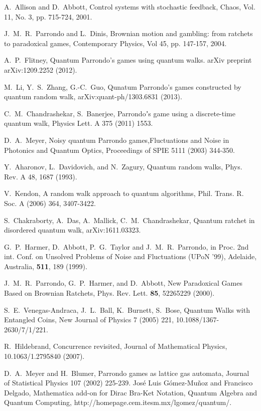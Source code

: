 \documentclass[english,aps,pra,amsmath,amssymb,showpacs,notitlepage,onecolumn]{revtex4-1}
\begin{document}
\begin{thebibliography}{99}
A.~Allison and D.~Abbott, Control systems with stochastic feedback, Chaos, Vol. 11, No. 3, pp. 715-724, 2001.

J.~M.~R.~Parrondo and L.~Dinis, Brownian motion and gambling: from ratchets to paradoxical games, Contemporary Physics, Vol 45, pp. 147-157, 2004.

A.~P.~Flitney, Quantum Parrondo's games using quantum walks. arXiv preprint arXiv:1209.2252 (2012).

M.~Li, Y.~S.~Zhang, G.-C.~Guo, Qunatum Parrondo's games constructed by quantum random walk, arXiv:quant-ph/1303.6831 (2013).

C.~M.~Chandrashekar, S.~Banerjee, Parrondoʼs game using a discrete-time quantum walk, Physics Lett. A 375 (2011) 1553.

D.~A.~Meyer, Noisy quantum Parrondo games,Fluctuations and Noise in Photonics and Quantum Optics, Proceedings of SPIE 5111 (2003) 344-350.

Y.~Aharonov, L.~Davidovich, and N.~Zagury, Quantum random walks, Phys. Rev. A 48, 1687 (1993).

V.~Kendon, A random walk approach to quantum algorithms, Phil. Trans. R. Soc. A (2006) 364, 3407-3422. 

S.~Chakraborty, A.~Das, A.~Mallick, C.~M.~Chandrashekar, Quantum ratchet in disordered quantum walk, arXiv:1611.03323.

 G.~P.~Harmer, D.~Abbott, P.~G.~Taylor and J.~M.~R.~Parrondo, in Proc. 2nd int. Conf. on Unsolved Problems of Noise and Fluctuations (UPoN '99), Adelaide, Australia, \textbf{511}, 189 (1999). %

 J.~M.~R.~Parrondo, G.~P.~Harmer, and D.~Abbott, New Paradoxical Games Based on Brownian Ratchets, Phys. Rev. Lett. \textbf{85}, 5226\textendash{}5229 (2000). %

S.~E.~Venegas-Andraca, J.~L.~Ball, K.~Burnett, S.~Bose, Quantum Walks with Entangled Coins, New Journal of Physics 7 (2005) 221, 10.1088/1367-2630/7/1/221.

R.~Hildebrand, Concurrence revisited, Journal of Mathematical Physics, 10.1063/1.2795840 (2007).

D.~A.~Meyer and H.~Blumer, Parrondo games as lattice gas automata, Journal of Statistical Physics 107 (2002) 225-239.
Jos\'{e} Luis G\'{o}mez-Mu\~{n}oz and Francisco Delgado, Mathematica add-on for Dirac Bra-Ket Notation, Quantum Algebra and Quantum Computing, http://homepage.cem.itesm.mx/lgomez/quantum/.


\end{thebibliography}
 
\end{document}
